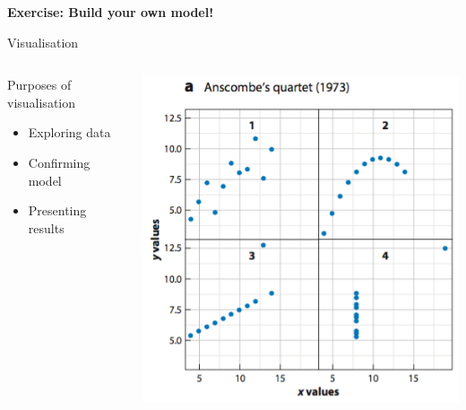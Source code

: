 \documentclass{beamer}
\begin{document}
\begin{frame}[plain]
    \begin{center}
    \textbf{\LARGE Exercise: Build your own model!}
    \end{center}
\end{frame}

\begin{frame}{Visualisation}
    \begin{columns}
        \begin{column}{0.4\textwidth}
            Purposes of visualisation
            \begin{itemize}[<+->]
                \item Exploring data
                \item Confirming model
                \item Presenting results
            \end{itemize}
        \end{column}
        \begin{column}{0.6\textwidth}
            \includegraphics[width=\textwidth]{img/anscombe.png}
        \end{column}
    \end{columns}
\end{frame}
\end{document}
